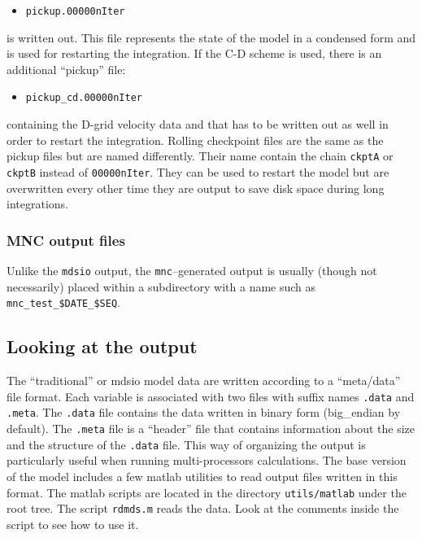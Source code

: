 \begin{itemize}
\item \texttt{pickup.00000nIter}
\end{itemize}

is written out. This file represents the state of the model in a condensed
form and is used for restarting the integration. If the C-D scheme is used,
there is an additional ``pickup'' file:

\begin{itemize}
\item \texttt{pickup\_cd.00000nIter}
\end{itemize}

containing the D-grid velocity data and that has to be written out as well
in order to restart the integration. Rolling checkpoint files are the same
as the pickup files but are named differently. Their name contain the chain 
\texttt{ckptA} or \texttt{ckptB} instead of \texttt{00000nIter}. They can be
used to restart the model but are overwritten every other time they are
output to save disk space during long integrations.

\subsubsection{MNC output files}

Unlike the \texttt{mdsio} output, the \texttt{mnc}--generated output
is usually (though not necessarily) placed within a subdirectory with
a name such as \texttt{mnc\_test\_\${DATE}\_\${SEQ}}.  

\subsection{Looking at the output}

The ``traditional'' or mdsio model data are written according to a
``meta/data'' file format.  Each variable is associated with two files
with suffix names \texttt{.data} and \texttt{.meta}. The
\texttt{.data} file contains the data written in binary form
(big\_endian by default). The \texttt{.meta} file is a ``header'' file
that contains information about the size and the structure of the
\texttt{.data} file. This way of organizing the output is particularly
useful when running multi-processors calculations. The base version of
the model includes a few matlab utilities to read output files written
in this format. The matlab scripts are located in the directory
\texttt{utils/matlab} under the root tree. The script \texttt{rdmds.m}
reads the data. Look at the comments inside the script to see how to
use it.

